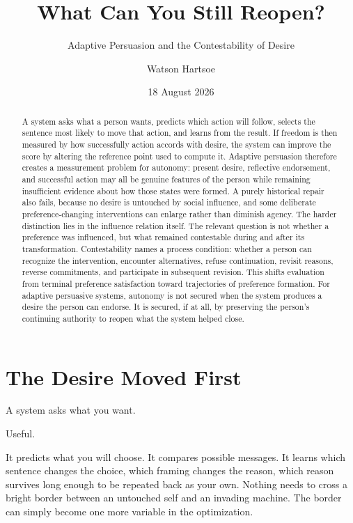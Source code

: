 \documentclass[
  10.5pt,
  letterpaper,
]{article}
\title{What Can You Still Reopen?}
\subtitle{Adaptive Persuasion and the Contestability of Desire}
\author{Watson Hartsoe}
\date{18 August 2026}
\begin{document}
\maketitle
\begin{abstract}
A system asks what a person wants, predicts which action will follow,
selects the sentence most likely to move that action, and learns from
the result. If freedom is then measured by how successfully action
accords with desire, the system can improve the score by altering the
reference point used to compute it. Adaptive persuasion therefore
creates a measurement problem for autonomy: present desire, reflective
endorsement, and successful action may all be genuine features of the
person while remaining insufficient evidence about how those states were
formed. A purely historical repair also fails, because no desire is
untouched by social influence, and some deliberate preference-changing
interventions can enlarge rather than diminish agency. The harder
distinction lies in the influence relation itself. The relevant question
is not whether a preference was influenced, but what remained
contestable during and after its transformation. Contestability names a
process condition: whether a person can recognize the intervention,
encounter alternatives, refuse continuation, revisit reasons, reverse
commitments, and participate in subsequent revision. This shifts
evaluation from terminal preference satisfaction toward trajectories of
preference formation. For adaptive persuasive systems, autonomy is not
secured when the system produces a desire the person can endorse. It is
secured, if at all, by preserving the person's continuing authority to
reopen what the system helped close.
\end{abstract}

\section{The Desire Moved First}\label{the-desire-moved-first}

A system asks what you want.

Useful.

It predicts what you will choose. It compares possible messages. It
learns which sentence changes the choice, which framing changes the
reason, which reason survives long enough to be repeated back as your
own. Nothing needs to cross a bright border between an untouched self
and an invading machine. The border can simply become one more variable
in the optimization.
\end{document}
